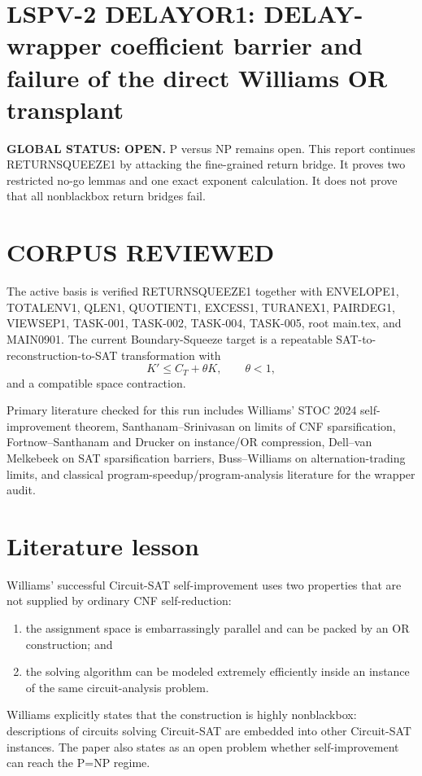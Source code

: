 \documentclass[11pt]{article}
\begin{document}
\section*{LSPV-2 DELAYOR1: DELAY-wrapper coefficient barrier and failure of the direct Williams OR transplant}

\textbf{GLOBAL STATUS: OPEN.} P versus NP remains open. This report continues RETURNSQUEEZE1 by attacking the fine-grained return bridge. It proves two restricted no-go lemmas and one exact exponent calculation. It does not prove that all nonblackbox return bridges fail.

\section*{CORPUS REVIEWED}
The active basis is verified RETURNSQUEEZE1 together with ENVELOPE1, TOTALENV1, QLEN1, QUOTIENT1, EXCESS1, TURANEX1, PAIRDEG1, VIEWSEP1, TASK-001, TASK-002, TASK-004, TASK-005, root main.tex, and MAIN0901. The current Boundary-Squeeze target is a repeatable SAT-to-reconstruction-to-SAT transformation with
\[
K'\le C_T+\theta K,\qquad \theta<1,
\]
and a compatible space contraction.

Primary literature checked for this run includes Williams' STOC 2024 self-improvement theorem, Santhanam--Srinivasan on limits of CNF sparsification, Fortnow--Santhanam and Drucker on instance/OR compression, Dell--van Melkebeek on SAT sparsification barriers, Buss--Williams on alternation-trading limits, and classical program-speedup/program-analysis literature for the wrapper audit.

\section*{Literature lesson}
Williams' successful Circuit-SAT self-improvement uses two properties that are not supplied by ordinary CNF self-reduction:
\begin{enumerate}
\item the assignment space is embarrassingly parallel and can be packed by an OR construction; and
\item the solving algorithm can be modeled extremely efficiently inside an instance of the same circuit-analysis problem.
\end{enumerate}
Williams explicitly states that the construction is highly nonblackbox: descriptions of circuits solving Circuit-SAT are embedded into other Circuit-SAT instances. The paper also states as an open problem whether self-improvement can reach the P=NP regime.
\end{document}
